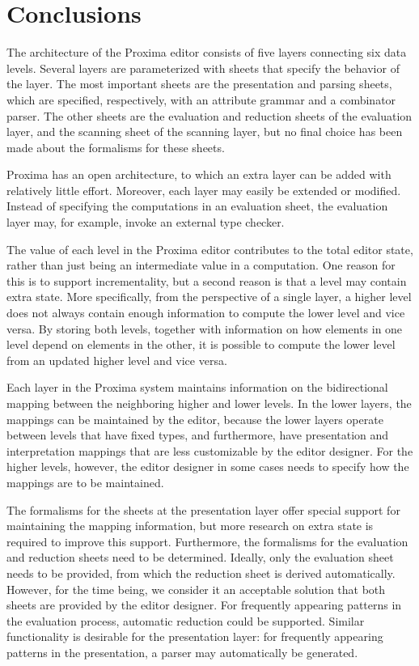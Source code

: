 \documentclass{speauth}
\begin{document}
\section{Conclusions}

The architecture of the Proxima editor consists of five layers connecting six data levels. Several layers are parameterized with sheets that specify the behavior of the layer. The most important sheets are the presentation and parsing sheets, which are specified, respectively, with an attribute grammar and a combinator parser. The other sheets are the evaluation and reduction sheets of the evaluation layer, and the scanning sheet of the scanning layer, but no final choice has been made about the formalisms for these sheets.

Proxima has an open architecture, to which an extra layer can be added with relatively little effort. Moreover, each layer may easily be extended or modified. Instead of specifying the computations in an evaluation sheet, the evaluation layer may, for example, invoke an external type checker. 

The value of each level in the Proxima editor contributes to the total editor state, rather than just being an intermediate value in a computation. One reason for this is to support incrementality, but a second reason is that a level may contain extra state. More specifically, from the perspective of a single layer, a higher level does not always contain enough information to compute the lower level and vice versa. By storing both levels, together with information on how elements in one level depend on elements in the other,
 it is possible to compute the lower level from an updated higher level and vice versa.

Each layer in the Proxima system maintains information on the bidirectional mapping between the neighboring higher and lower levels. In the lower layers, the mappings can be maintained by the editor, because the lower layers operate between levels that have fixed types, and furthermore, have presentation and interpretation mappings that are less customizable by the editor designer. For the higher levels, however, the editor designer in some cases needs to specify how the mappings are to be maintained. 

The formalisms for the sheets at the presentation layer offer special support for maintaining the mapping information, but more research \bc on extra state \ec is required to improve this support. Furthermore, the formalisms for the evaluation and reduction sheets need to be determined. Ideally, only the evaluation sheet needs to be provided, from which the reduction sheet is derived automatically. However, for the time being, we consider it an acceptable solution that both sheets are provided by the editor designer. For frequently appearing patterns in the evaluation process, automatic reduction could be supported. Similar functionality is desirable for the presentation layer: for frequently appearing patterns in the presentation, a parser may automatically be generated.
 




\end{document}
